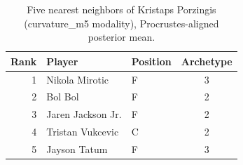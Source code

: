 \begin{table}[htbp]
  \centering\small
  \begin{tabular}{rllc}
    \toprule
    Rank & Player & Position & Archetype \\
    \midrule
    1 & Nikola Mirotic & F & 3 \\
    2 & Bol Bol & F & 2 \\
    3 & Jaren Jackson Jr. & F & 2 \\
    4 & Tristan Vukcevic & C & 2 \\
    5 & Jayson Tatum & F & 3 \\
    \bottomrule
  \end{tabular}
  \caption{Five nearest neighbors of Kristaps Porzingis (curvature_m5 modality), Procrustes-aligned posterior mean.}
  \label{tab:Kristaps_Porzingis_neighbors_curvature_m5}
\end{table}

